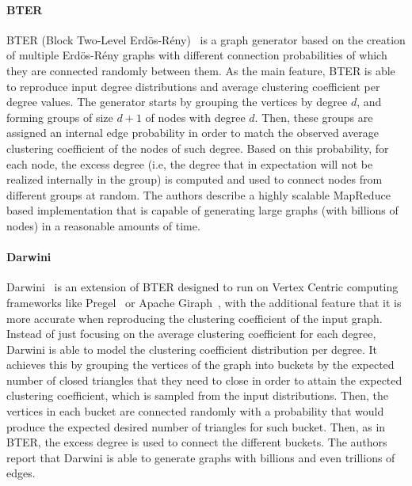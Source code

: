 \paragraph{BTER} BTER (Block Two-Level
Erd\"{o}s-R\'{e}ny)~\cite{kolda2014scalable} is a graph generator based on the
creation of multiple Erd\"{o}s-R\'{e}ny graphs with different connection
probabilities  of which they are connected randomly between them. As the main feature, BTER is able
to reproduce input degree distributions and average clustering
coefficient per degree values. The generator starts by grouping the vertices
by degree $d$, and forming groups of size $d+1$ of nodes with degree $d$. Then, these
groups are assigned an internal edge probability in order to match the observed
average clustering coefficient of the nodes of such degree. Based on this
probability, for each node, the excess degree (i.e, the degree that in
expectation will not be realized internally in the group) is computed and used to connect
nodes from different groups at random. The authors describe a highly scalable
MapReduce based implementation that is capable of generating large graphs (with
billions of nodes) in a reasonable amounts of time.

\paragraph{Darwini} Darwini~\cite{edunov2016darwini} is an extension of BTER
designed to run on Vertex Centric computing frameworks like
Pregel~\cite{malewicz2010pregel} or Apache Giraph~\cite{ching2015one}, with the
additional feature that it is more accurate when reproducing the clustering
coefficient of the input graph. Instead of just focusing on the average
clustering coefficient for each degree, Darwini is able to model the clustering
coefficient distribution per degree. It achieves this by grouping the vertices
of the graph into buckets by the expected number of closed triangles that they need
to close in order to attain the expected clustering coefficient, which is
sampled from the input distributions. Then, the vertices in each bucket are
connected randomly with a probability that would produce the expected 
desired number of triangles for such bucket. Then, as in BTER, the excess degree
is used to connect the different buckets. The authors report that Darwini is
able to generate graphs with billions and even trillions of edges.




